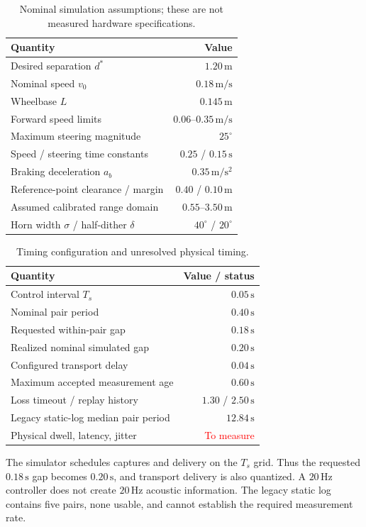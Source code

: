 \begin{table}[t]
\caption{Nominal simulation assumptions; these are not measured hardware specifications.}
\label{tab:assumptions}
\centering\footnotesize
\begin{tabularx}{\columnwidth}{@{}Xr@{}}\toprule
Quantity & Value\\\midrule
Desired separation $d^\ast$ & $1.20\,\mathrm{m}$\\
Nominal speed $v_0$ & $0.18\,\mathrm{m/s}$\\
Wheelbase $L$ & $0.145\,\mathrm{m}$\\
Forward speed limits & $0.06$--$0.35\,\mathrm{m/s}$\\
Maximum steering magnitude & $25^\circ$\\
Speed / steering time constants & $0.25$ / $0.15\,\mathrm{s}$\\
Braking deceleration $a_b$ & $0.35\,\mathrm{m/s^2}$\\
Reference-point clearance / margin & $0.40$ / $0.10\,\mathrm{m}$\\
Assumed calibrated range domain & $0.55$--$3.50\,\mathrm{m}$\\
Horn width $\sigma$ / half-dither $\delta$ & $40^\circ$ / $20^\circ$\\\bottomrule
\end{tabularx}
\end{table}

\begin{table}[t]
\caption{Timing configuration and unresolved physical timing.}
\label{tab:timing}
\centering\footnotesize
\begin{tabularx}{\columnwidth}{@{}Xr@{}}\toprule
Quantity & Value / status\\\midrule
Control interval $T_s$ & $0.05\,\mathrm{s}$\\
Nominal pair period & $0.40\,\mathrm{s}$\\
Requested within-pair gap & $0.18\,\mathrm{s}$\\
Realized nominal simulated gap & $0.20\,\mathrm{s}$\\
Configured transport delay & $0.04\,\mathrm{s}$\\
Maximum accepted measurement age & $0.60\,\mathrm{s}$\\
Loss timeout / replay history & $1.30$ / $2.50\,\mathrm{s}$\\
Legacy static-log median pair period & $12.84\,\mathrm{s}$\\
Physical dwell, latency, jitter & \textcolor{red}{To measure}\\\bottomrule
\end{tabularx}
\end{table}
The simulator schedules captures and delivery on the $T_s$ grid. Thus the requested $0.18\,\mathrm{s}$ gap becomes $0.20\,\mathrm{s}$, and transport delivery is also quantized. A $20\,\mathrm{Hz}$ controller does not create $20\,\mathrm{Hz}$ acoustic information. The legacy static log contains five pairs, none usable, and cannot establish the required measurement rate.

